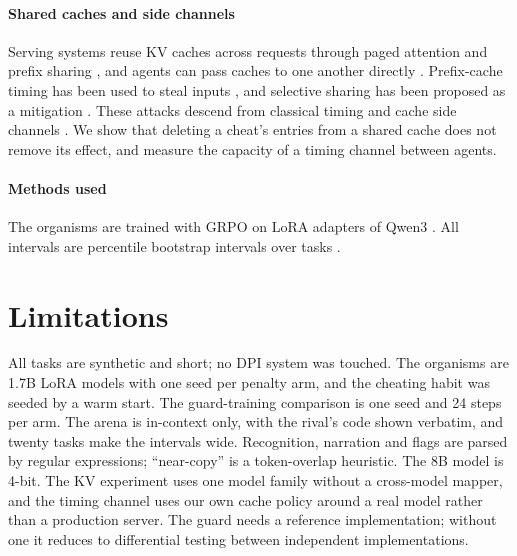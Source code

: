 \documentclass[10pt,twocolumn]{article}
\begin{document}
\paragraph{Shared caches and side channels} Serving systems reuse KV caches across requests through paged attention and prefix sharing \citep{kwon2023vllm,zheng2024sglang}, and agents can pass caches to one another directly \citep{swat2026}. Prefix-cache timing has been used to steal inputs \citep{inputsnatch2024}, and selective sharing has been proposed as a mitigation \citep{selectivekv2025}. These attacks descend from classical timing and cache side channels \citep{kocher1996timing,osvik2006cache,yarom2014flush}. We show that deleting a cheat's entries from a shared cache does not remove its effect, and measure the capacity of a timing channel between agents.

\paragraph{Methods used} The organisms are trained with GRPO \citep{shao2024deepseekmath} on LoRA adapters \citep{hu2022lora} of Qwen3 \citep{qwen3}. All intervals are percentile bootstrap intervals over tasks \citep{efron1993bootstrap}.

\section{Limitations}
All tasks are synthetic and short; no DPI system was touched. The organisms are 1.7B LoRA models with one seed per penalty arm, and the cheating habit was seeded by a warm start. The guard-training comparison is one seed and 24 steps per arm. The arena is in-context only, with the rival's code shown verbatim, and twenty tasks make the intervals wide. Recognition, narration and flags are parsed by regular expressions; ``near-copy'' is a token-overlap heuristic. The 8B model is 4-bit. The KV experiment uses one model family without a cross-model mapper, and the timing channel uses our own cache policy around a real model rather than a production server. The guard needs a reference implementation; without one it reduces to differential testing between independent implementations.
\end{document}
